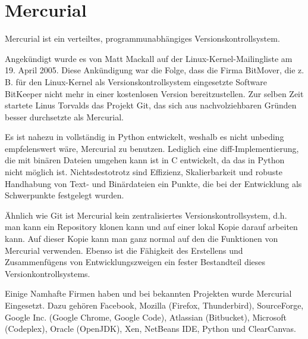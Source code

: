 \documentclass[11pt]{article}
\begin{document}
\section{Mercurial}
Mercurial ist ein verteiltes, programmunabhängiges Versionskontrollsystem.

Angekündigt wurde es von Matt Mackall auf der Linux-Kernel-Mailingliste am 19. April 2005. Diese Ankündigung war die Folge, dass die Firma BitMover, die z. B. für den Linux-Kernel als Versionskontrollsystem eingesetzte Software BitKeeper nicht mehr in einer kostenlosen Version bereitzustellen. Zur selben Zeit startete Linus Torvalds das Projekt Git, das sich aus nachvolziehbaren Gründen besser durchsetzte als Mercurial.

Es ist nahezu in vollständig in Python entwickelt, weshalb es nicht unbeding empfelenswert wäre, Mercurial zu benutzen. Lediglich eine diff-Implementierung, die mit binären Dateien umgehen kann ist in C entwickelt, da das in Python nicht möglich ist. Nichtsdestotrotz sind Effizienz, Skalierbarkeit und robuste Handhabung von Text- und Binärdateien ein Punkte, die bei der Entwicklung als Schwerpunkte festgelegt wurden.

Ähnlich wie Git ist Mercurial kein zentralisiertes Versionskontrollsystem, d.h. man kann ein Repository klonen kann und auf einer lokal Kopie darauf arbeiten kann. Auf dieser Kopie kann man ganz normal auf den die Funktionen von Mercurial verwenden. Ebenso ist die Fähigkeit des Erstellens und Zusammenfügens von Entwicklungszweigen ein fester Bestandteil dieses Versionkontrollsystems.

Einige Namhafte Firmen haben und bei bekannten Projekten wurde Mercurial Eingesetzt. Dazu gehören Facebook, Mozilla (Firefox, Thunderbird), SourceForge, Google Inc. (Google Chrome, Google Code), Atlassian (Bitbucket), Microsoft (Codeplex), Oracle (OpenJDK), Xen, NetBeans IDE, Python und ClearCanvas.  
\end{document}
